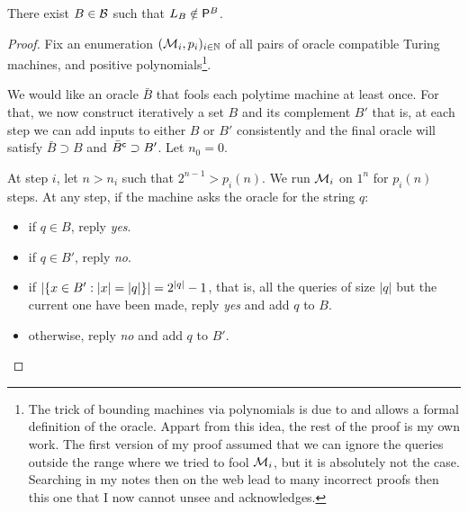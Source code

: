     \begin{claim}
        There exist $B \in \mathcal B$ such that $L_B \notin \mathsf{P}^B$.
    \end{claim}
    \begin{proof}
        Fix an enumeration $(\mathcal{M}_i, p_i)_{i \in \mathbb N}$ of all pairs
        of oracle compatible Turing machines,
        and positive polynomials\footnote{
            The trick of bounding machines via polynomials
            is due to \cite{baker1975relativizations}
            and allows a formal definition of the oracle.
            Appart from this idea, the rest of the proof is my own work.
            The first version of my proof assumed that 
            we can ignore the queries outside the range where 
            we tried to fool $\mathcal{M}_i$, but it is absolutely 
            not the case. Searching in my notes then on the
            web lead to many incorrect proofs then this one
            that I now cannot unsee
            and acknowledges.
        }.

        We would like an oracle $\bar B$
        that fools each polytime machine at least once.
        For that, we now construct iteratively a set $B$ and its complement $B'$
        that is, at each step we can add inputs to either $B$ or $B'$
        consistently and the final oracle will satisfy $\bar B \supset B$ and 
        $\bar B^\mathsf{c} \supset B'$.
        Let $n_0 = 0$.

        At step $i$, let $n > n_{i}$ such that
        $2^{n-1} > p_i(n)$.
        We run $\mathcal{M}_i$ on $1^n$ for $p_i(n)$ steps.
        At any step, if the machine asks the oracle for the string $q$:
        \begin{itemize}
            \item if $q \in B$, reply \textit{yes}.
            \item if $q \in B'$, reply \textit{no}.
            \item if $\left| \left\{ x \in B' : |x| = |q| \right\} \right| = 2^{\left| q \right|} - 1$,
                that is, all the queries of size $|q|$ but the current one
                have been made, reply \textit{yes} and add $q$ to $B$.
            \item otherwise, reply \textit{no} and add $q$ to $B'$.
        \end{itemize}
        

\end{proof}
